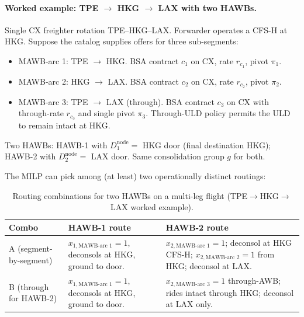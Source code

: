 \documentclass[11pt,a4paper]{article}
\theoremstyle{definition}
\begin{document}
\paragraph{Worked example: TPE $\to$ HKG $\to$ LAX with two HAWBs.}
Single CX freighter rotation TPE--HKG--LAX. Forwarder operates a CFS-H at
HKG. Suppose the catalog supplies offers for three sub-segments:
\begin{itemize}[noitemsep]
  \item MAWB-arc 1: TPE $\to$ HKG. BSA contract $c_1$ on CX, rate $r_{c_1}$,
        pivot $\pi_1$.
  \item MAWB-arc 2: HKG $\to$ LAX. BSA contract $c_2$ on CX, rate
        $r_{c_2}$, pivot $\pi_2$.
  \item MAWB-arc 3: TPE $\to$ LAX (through). BSA contract $c_3$ on CX with
        through-rate $r_{c_3}$ and single pivot $\pi_3$. Through-ULD policy
        permits the ULD to remain intact at HKG.
\end{itemize}
Two HAWBs: HAWB-1 with $D_1^{\text{node}} = $ HKG door (final destination
HKG); HAWB-2 with $D_2^{\text{node}} = $ LAX door. Same consolidation
group $g$ for both.

The MILP can pick among (at least) two operationally distinct routings:
\begin{table}[H]
\centering
\caption{Routing combinations for two HAWBs on a multi-leg flight (TPE$\to$HKG$\to$LAX worked example).}
\label{tab:multi-leg-combos}
\begin{tabular}{lp{4.5cm}p{4.5cm}}
\toprule
Combo & HAWB-1 route & HAWB-2 route \\
\midrule
A (segment-by-segment) & $x_{1, \text{MAWB-arc 1}} = 1$, deconsols at HKG, ground to door. & $x_{2, \text{MAWB-arc 1}} = 1$; deconsol at HKG CFS-H; $x_{2, \text{MAWB-arc 2}} = 1$ from HKG; deconsol at LAX. \\
B (through for HAWB-2) & $x_{1, \text{MAWB-arc 1}} = 1$, deconsols at HKG, ground to door. & $x_{2, \text{MAWB-arc 3}} = 1$ through-AWB; rides intact through HKG; deconsol at LAX only. \\
\bottomrule
\end{tabular}
\end{table}
\end{document}
